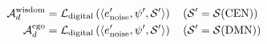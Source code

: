 \begin{align}
    \mthScientificAd^{\mathrm{wisdom}} &= \mthLangTranslation{\mthCoupledState{\mthEnvNoise', \mthVirtualConviction', \mthState'} } \quad \left( \mthState' = \mthCENState \right) \\
    \mthScientificAd^{\mathrm{ego}}    &= \mthLangTranslation{\mthCoupledState{\mthEnvNoise', \mthVirtualConviction', \mthState'} } \quad \left( \mthState' = \mthDMNState \right)
\end{align}


